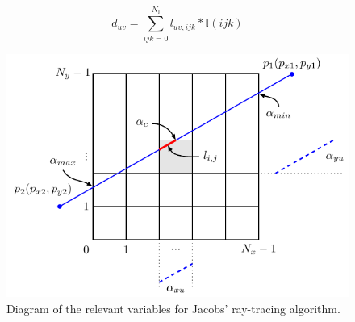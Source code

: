 \begin{equation}
d_{uv}= \sum_{ijk=0}^{N_\mathbb{I}}l_{uv,ijk}*\mathbb{I}(ijk)
\label{eq:ray-voxel}
\end{equation}


\begin{figure}
\begin{center}

\includegraphics{GPUmethods/Amatrix_siddon_diagram.pdf} 
\end{center}

\caption[Jacob's ray tracing diagram]{\label{fig:Siddon} Diagram of the relevant variables for Jacobs' ray-tracing algorithm.} 
\end{figure}



